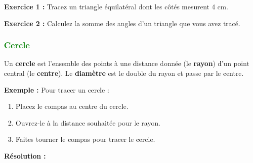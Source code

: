 \documentclass{article}
\begin{document}
\vspace{0.2cm}

\begin{tcolorbox}[colback=yellow!10!white, colframe=yellow!75!black, title=\textcolor{white}{Application directe}, sharp corners=south]
    \textbf{Exercice 1 :} Tracez un triangle équilatéral dont les côtés mesurent 4 cm.

    \textbf{Exercice 2 :} Calculez la somme des angles d’un triangle que vous avez tracé.
\end{tcolorbox}

\vspace{0.5cm}

\subsubsection{\textcolor{green}{Cercle}}

\begin{tcolorbox}[colback=red!10!white, colframe=red!75!black, title=\textcolor{white}{Définitions}, sharp corners=south]
    Un \textbf{cercle} est l'ensemble des points à une distance donnée (le \textbf{rayon}) d'un point central (le \textbf{centre}).
    Le \textbf{diamètre} est le double du rayon et passe par le centre.
\end{tcolorbox}

\vspace{0.2cm}

\begin{tcolorbox}[colback=orange!10!white, colframe=orange!75!black, title=\textcolor{white}{Exemple de traçage}, sharp corners=south]
    \textbf{Exemple :} Pour tracer un cercle :
    \begin{enumerate}
        \item Placez le compas au centre du cercle.
        \item Ouvrez-le à la distance souhaitée pour le rayon.
        \item Faites tourner le compas pour tracer le cercle.
    \end{enumerate}
\end{tcolorbox}

\textbf{Résolution :}
\end{document}
